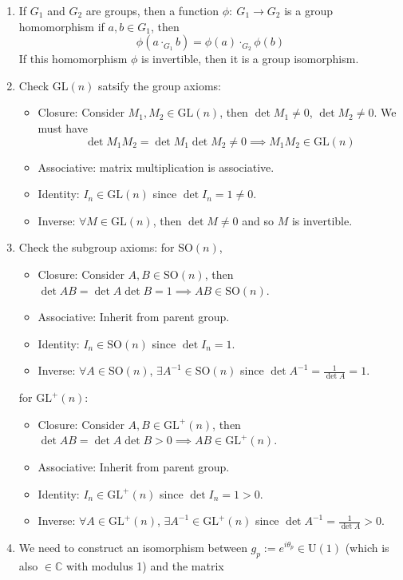 \documentclass[a4paper]{article}
\begin{document}
\begin{ans}\leavevmode
\begin{enumerate}[label=(\roman*)]
\item If $G_1$ and $G_2$ are groups, then a function $\phi:~G_1\rightarrow G_2$ is a group homomorphism if $a,b\in G_1$, then
$$\phi(a\cdot_{G_1}b)=\phi(a)\cdot_{G_2}\phi(b)$$
If this homomorphism $\phi$ is invertible, then it is a group isomorphism.
\item Check $\text{GL}(n)$ satsify the group axioms:
\begin{itemize}
\item Closure: Consider $M_1,M_2\in\text{GL}(n)$, then $\det M_1\neq0$, $\det M_2\neq 0$. We must have
$$\det M_1M_2=\det M_1\det M_2\neq 0\implies M_1M_2\in\text{GL}(n)$$
\item Associative: matrix multiplication is associative.
\item Identity: $I_n\in\text{GL}(n)$ since $\det I_n=1\neq 0$.
\item Inverse: $\forall M\in\text{GL}(n)$, then $\det M\neq 0$ and so $M$ is invertible.
\end{itemize}
\item Check the subgroup axioms: for $\text{SO}(n)$,
\begin{itemize}
\item Closure: Consider $A,B\in\text{SO}(n)$, then $\det AB=\det A\det B=1\implies AB\in\text{SO}(n)$.
\item Associative: Inherit from parent group.
\item Identity: $I_n\in\text{SO}(n)$ since $\det I_n=1$.
\item Inverse: $\forall A\in\text{SO}(n)$, $\exists A^{-1}\in\text{SO}(n)$ since $\det A^{-1}=\frac{1}{\det A}=1$.
\end{itemize}
for $\text{GL}^+(n)$:
\begin{itemize}
\item Closure: Consider $A,B\in\text{GL}^+(n)$, then $\det AB=\det A\det B>0\implies AB\in\text{GL}^+(n)$.
\item Associative: Inherit from parent group.
\item Identity: $I_n\in\text{GL}^+(n)$ since $\det I_n=1>0$.
\item Inverse: $\forall A\in\text{GL}^+(n)$, $\exists A^{-1}\in\text{GL}^+(n)$ since $\det A^{-1}=\frac{1}{\det A}>0$.
\end{itemize}
\item We need to construct an isomorphism between $g_p:=e^{i\theta_p}\in\text{U}(1)$ (which is also $\in\mathbb{C}$ with modulus 1) and the matrix

\end{enumerate}
\end{ans}
\end{document}
